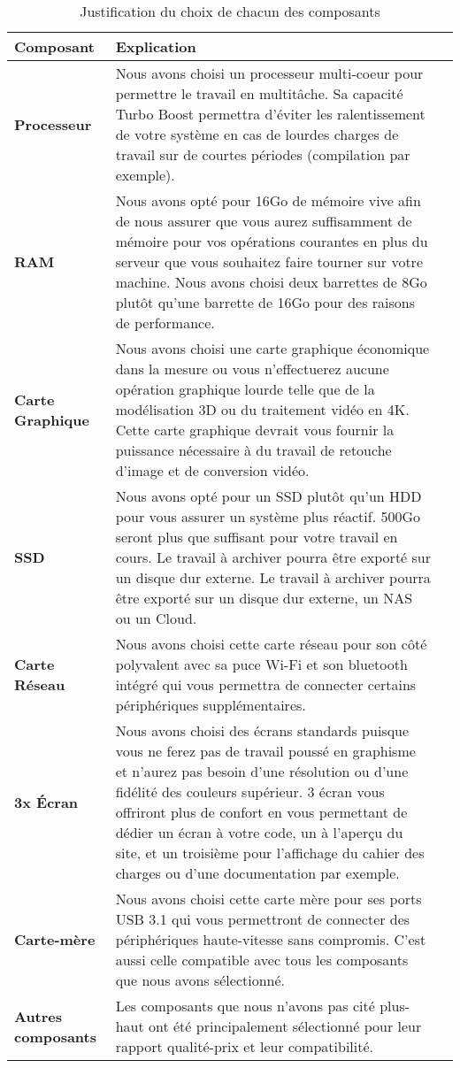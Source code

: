 \begin{table}[ht]
	\centering
	\begin{tabularx}{\textwidth}{|C|X|X|}
		\hline
		\textbf{Composant} & \textbf{Explication} \\
		\hline
		\textbf{Processeur} & Nous avons choisi un processeur multi-coeur pour permettre le travail en multitâche. Sa capacité Turbo Boost permettra d'éviter les ralentissement de votre système en cas de lourdes charges de travail sur de courtes périodes (compilation par exemple). \\
		\hline
		\textbf{RAM} & Nous avons opté pour 16Go de mémoire vive afin de nous assurer que vous aurez suffisamment de mémoire pour vos opérations courantes en plus du serveur que vous souhaitez faire tourner sur votre machine. Nous avons choisi deux barrettes de 8Go plutôt qu'une barrette de 16Go pour des raisons de performance. \\
		\hline
		\textbf{Carte Graphique} & Nous avons choisi une carte graphique économique dans la mesure ou vous n'effectuerez aucune opération graphique lourde telle que de la modélisation 3D ou du traitement vidéo en 4K. Cette carte graphique devrait vous fournir la puissance nécessaire à du travail de retouche d'image et de conversion vidéo. \\
		\hline
		\textbf{SSD} & Nous avons opté pour un SSD plutôt qu'un HDD pour vous assurer un système plus réactif. 500Go seront plus que suffisant pour votre travail en cours. Le travail à archiver pourra être exporté sur un disque dur externe. Le travail à archiver pourra être exporté sur un disque dur externe, un NAS ou un Cloud. \\
		\hline
		\textbf{Carte Réseau} & Nous avons choisi cette carte réseau pour son côté polyvalent avec sa puce Wi-Fi et son bluetooth intégré qui vous permettra de connecter certains périphériques supplémentaires.  \\
		\hline
		\textbf{3x Écran} & Nous avons choisi des écrans standards puisque vous ne ferez pas de travail poussé en graphisme et n'aurez pas besoin d'une résolution ou d'une fidélité des couleurs supérieur. 3 écran vous offriront plus de confort en vous permettant de dédier un écran à votre code, un à l'aperçu du site, et un troisième pour l'affichage du cahier des charges ou d'une documentation par exemple. \\
		\hline
		\textbf{Carte-mère} & Nous avons choisi cette carte mère pour ses ports USB 3.1 qui vous permettront de connecter des périphériques haute-vitesse sans compromis. C'est aussi celle compatible avec tous les composants que nous avons sélectionné. \\
		\hline
		\textbf{Autres composants} & Les composants que nous n'avons pas cité plus-haut ont été principalement sélectionné pour leur rapport qualité-prix et leur compatibilité. \\
		\hline
	\end{tabularx}
	\caption{Justification du choix de chacun des composants}
	\label{tab:composants}
\end{table}